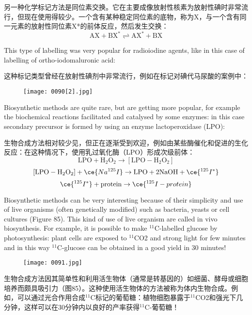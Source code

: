 \documentclass[dvipsnames, svgnames,a4paper,11pt]{article}
\begin{document}
另一种化学标记方法是同位素交换。它在主要成像放射性核素为放射性碘时非常流行，但现在使用得较少。一个含有某种稳定同位素的底物，称为X，与一个含有同一元素的放射性同位素X*的前体反应，然后发生交换：
\[
\mathrm{AX} + \mathrm{BX}^* \rightleftharpoons \mathrm{AX}^* + \mathrm{BX}
\]

This type of labelling was very popular for radioiodine agents, like in this case of
labelling of ortho-iodomaluronic acid:

这种标记类型曾经在放射性碘剂中非常流行，例如在标记对碘代马尿酸的案例中：

\begin{figure*}[h]
    \centering
    \texttt{[image: 0090[2].jpg]}
\end{figure*}

Biosynthetic methods are quite rare, but are getting more popular, for example the
biochemical reactions facilitated and catalysed by some enzymes: in this case
secondary precursor is formed by using an enzyme lactoperoxidase (LPO):

生物合成方法相对较少见，但正在逐渐受到欢迎，例如由某些酶催化和促进的生化反应：在这种情况下，使用乳过氧化酶（LPO）形成次级前体：
\[
\mathrm{LPO} + \mathrm{H_2O_2} \rightarrow [\mathrm{LPO-H_2O_2}]
\]
\[
[\mathrm{LPO-H_2O_2}] + \ce{Na^{125}I} \rightarrow \mathrm{LPO} + 2\mathrm{NaOH} + \ce{^{125}I^*}
\]
\[
\ce{^{125}I^*} + \mathrm{protein} \rightarrow \ce{^{125}I-protein}
\]

Biosynthetic methods can be very interesting because of their simplicity and use of
live organisms (often genetically modified) such as bacteria, yeasts or cell cultures
(Figure 85). This kind of use of live organism are called in vivo biosynthesis. For
example, it is possible to make ${}^{11}\mathrm{C}$-labelled glucose by photosynthesis: plant cells
are exposed to ${}^{11}\mathrm{C}$O2 and strong light for few minutes and in this way ${}^{11}\mathrm{C}$-glucose
can be obtained in a good yield in 30 minutes!

\begin{figure}[h]
    \centering
    \texttt{[image: 0091.jpg]}
     \label{fig85}
\end{figure}

生物合成方法因其简单性和利用活生物体（通常是转基因的）如细菌、酵母或细胞培养而颇具吸引力（图85）。这种使用活生物体的方法被称为体内生物合成。例如，可以通过光合作用合成${}^{11}\mathrm{C}$标记的葡萄糖：植物细胞暴露于${}^{11}\mathrm{C}$O2和强光下几分钟，这样可以在30分钟内以良好的产率获得${}^{11}\mathrm{C}$-葡萄糖！
\end{document}
